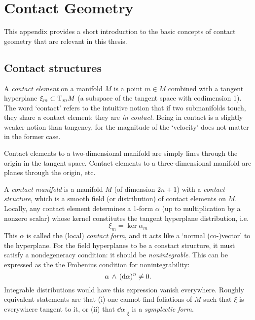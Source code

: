 \chapter{Contact Geometry}
\label{app:contact_geometry}
This appendix provides a short introduction to the basic concepts of contact geometry that are relevant in this thesis.

\section{Contact structures}
\label{sec:contact_structures}
A \emph{contact element} on a manifold \(M\) is a point \(m \in M\) combined with a tangent hyperplane \(\xi_m \subset \mathrm{T}_{m} M\) (a subspace of the tangent space  with codimension 1). The word `contact' refers to the intuitive notion that if two submanifolds touch, they share a contact element: they are \emph{in contact}. Being in contact is a slightly weaker notion than tangency, for the magnitude of the `velocity' does not matter in the former case. \cite{Cannas2001} 

Contact elements to a two-dimensional manifold are simply lines through the origin in the tangent space. Contact elements to a three-dimensional manifold are planes through the origin, etc.

A \emph{contact manifold} is a manifold \(M\) (of dimension \(2n+1\)) with a \emph{contact structure}, which is a smooth field (or distribution) of contact elements on \(M\). Locally, any contact element determines a 1-form \(\alpha\) (up to multiplication by a nonzero scalar) whose kernel constitutes the tangent hyperplane distribution, i.e. 
\begin{equation}
    \xi_m = \ker \alpha_m
    \label{eq:contact_form}
\end{equation}
This \(\alpha\) is called the (local) \emph{contact form}, and it acts like a `normal (co-)vector' to the hyperplane. For the field hyperplanes to be a constact structure, it must satisfy a nondegeneracy condition: it should be \emph{nonintegrable}. This can be expressed as the the Frobenius condition for nonintegrability: \cite{Cannas2001,Abraham1978,Arnold1989}
\begin{equation}
      \alpha\,\wedge\,(\dd{\alpha})^n  \neq 0.
\end{equation}
Integrable distributions would have this expression vanish everywhere. Roughly equivalent statements are that (i) one cannot find foliations of \(M\) such that \(\xi\) is everywhere tangent to it, or (ii) that \(\dd{\alpha}\vert_\xi\) is a \emph{symplectic form}. 

